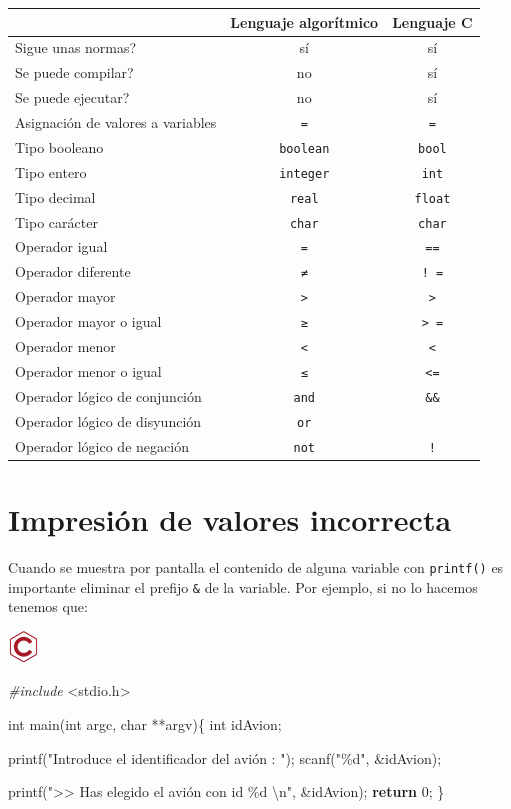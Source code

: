 \documentclass[
]{book}
\newenvironment{Shaded}{\begin{snugshade}}{\end{snugshade}}
\newcommand{\ControlFlowTok}[1]{\textcolor[rgb]{0.13,0.29,0.53}{\textbf{#1}}}
\newcommand{\DataTypeTok}[1]{\textcolor[rgb]{0.13,0.29,0.53}{#1}}
\newcommand{\DecValTok}[1]{\textcolor[rgb]{0.00,0.00,0.81}{#1}}
\newcommand{\ImportTok}[1]{#1}
\newcommand{\NormalTok}[1]{#1}
\newcommand{\PreprocessorTok}[1]{\textcolor[rgb]{0.56,0.35,0.01}{\textit{#1}}}
\newcommand{\SpecialCharTok}[1]{\textcolor[rgb]{0.00,0.00,0.00}{#1}}
\newcommand{\StringTok}[1]{\textcolor[rgb]{0.31,0.60,0.02}{#1}}
\begin{document}
\begin{longtable}[]{@{}lcc@{}}
\toprule
& Lenguaje algorítmico & Lenguaje C\tabularnewline
\midrule
\endhead
Sigue unas normas? & sí & sí\tabularnewline
Se puede compilar? & no & sí\tabularnewline
Se puede ejecutar? & no & sí\tabularnewline
Asignación de valores a variables & \texttt{=} & \texttt{=}\tabularnewline
Tipo booleano & \texttt{boolean} & \texttt{bool}\tabularnewline
Tipo entero & \texttt{integer} & \texttt{int}\tabularnewline
Tipo decimal & \texttt{real} & \texttt{float}\tabularnewline
Tipo carácter & \texttt{char} & \texttt{char}\tabularnewline
Operador igual & \texttt{=} & \texttt{==}\tabularnewline
Operador diferente & \texttt{≠} & \texttt{!\ =}\tabularnewline
Operador mayor & \texttt{\textgreater{}} & \texttt{\textgreater{}}\tabularnewline
Operador mayor o igual & \texttt{≥} & \texttt{\textgreater{}\ =}\tabularnewline
Operador menor & \texttt{\textless{}} & \texttt{\textless{}}\tabularnewline
Operador menor o igual & \texttt{≤} & \texttt{\textless{}=}\tabularnewline
Operador lógico de conjunción & \texttt{and} & \texttt{\&\&}\tabularnewline
Operador lógico de disyunción & \texttt{or} & \texttt{\textbar{}\textbar{}}\tabularnewline
Operador lógico de negación & \texttt{not} & \texttt{!}\tabularnewline
\bottomrule
\end{longtable}

\hypertarget{impresiuxf3n-de-valores-incorrecta}{%
\section{Impresión de valores incorrecta}\label{impresiuxf3n-de-valores-incorrecta}}

Cuando se muestra por pantalla el contenido de alguna variable con \texttt{printf()} es importante eliminar el prefijo \texttt{\&} de la variable. Por ejemplo, si no lo hacemos tenemos que:

\includegraphics{./img/c_err.png}

\begin{Shaded}
\begin{Highlighting}[]
\PreprocessorTok{\#include }\ImportTok{\textless{}stdio.h\textgreater{}}

\DataTypeTok{int}\NormalTok{ main(}\DataTypeTok{int}\NormalTok{ argc, }\DataTypeTok{char}\NormalTok{ **argv)\{}
    \DataTypeTok{int}\NormalTok{ idAvion;}

\NormalTok{    printf(}\StringTok{"Introduce el identificador del avión : "}\NormalTok{);}
\NormalTok{    scanf(}\StringTok{"\%d"}\NormalTok{, \&idAvion);}
    
\NormalTok{    printf(}\StringTok{"\textgreater{}\textgreater{} Has elegido el avión con id \%d }\SpecialCharTok{\textbackslash{}n}\StringTok{"}\NormalTok{, \&idAvion);}
    \ControlFlowTok{return} \DecValTok{0}\NormalTok{;}
\NormalTok{\}}
\end{Highlighting}
\end{Shaded}
\end{document}
